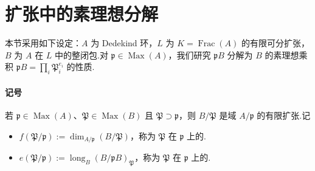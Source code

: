 \section{扩张中的素理想分解}\label{sec:nt-3-4}
本节采用如下设定：$A$ 为 Dedekind 环，$L$ 为 $K=\operatorname{Frac}(A)$ 的有限可分扩张，$B$ 为 $A$ 在 $L$ 中的整闭包.对 $\mathfrak p\in\operatorname{Max}(A)$，我们研究 $\mathfrak pB$ 分解为 $B$ 的素理想乘积 $\mathfrak pB=\prod_i\mathfrak P_i^{e_i}$ 的性质.

\paragraph{记号}
若 $\mathfrak p\in\operatorname{Max}(A)$、$\mathfrak P\in\operatorname{Max}(B)$ 且 $\mathfrak P\supset\mathfrak p$，则 $B/\mathfrak P$ 是域 $A/\mathfrak p$ 的有限扩张.记
\begin{itemize}
\item $f(\mathfrak P/\mathfrak p):=\dim_{A/\mathfrak p}(B/\mathfrak P)$，称为 $\mathfrak P$ 在 $\mathfrak p$ 上的.
\item $e(\mathfrak P/\mathfrak p):=\operatorname{long}_B(B/\mathfrak pB)_{\mathfrak P}$，称为 $\mathfrak P$ 在 $\mathfrak p$ 上的.
\end{itemize}

